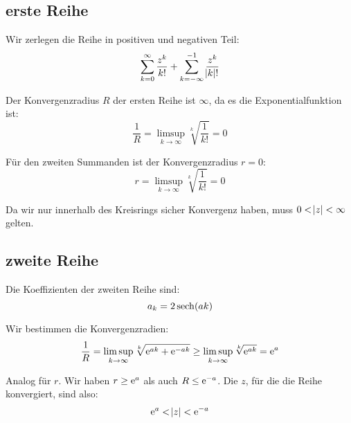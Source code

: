 \subsection{erste Reihe}

Wir zerlegen die Reihe in positiven und negativen Teil:
\[
	\sum_{k=0}^\infty \frac{z^k}{k!} + \sum_{k=-\infty}^{-1} \frac{z^k}{\abs k!}
\]

Der Konvergenzradius $R$ der ersten Reihe ist $\infty$, da es die Exponentialfunktion ist:
\[
	\frac 1R
	= \limsup_{k\to\infty} \sqrt[k]{\frac1{k!}}
	= 0
\]

Für den zweiten Summanden ist der Konvergenzradius $r = 0$:
\[
	r
	= \limsup_{k\to\infty} \sqrt[k]{\frac1{k!}}
	= 0
\]

Da wir nur innerhalb des Kreisrings sicher Konvergenz haben, muss $0 < \abs z <
\infty$ gelten.

\subsection{zweite Reihe}

Die Koeffizienten der zweiten Reihe sind:
\[
	a_k = 2 \operatorname{sech}(ak)
\]

Wir bestimmen die Konvergenzradien:
\[
	\frac 1R
	= \limsup_{k\to\infty} {\sqrt[k]{\mathrm e^{ak} + \mathrm e^{-ak}}}
	\geq \limsup_{k\to\infty} {\sqrt[k]{\mathrm e^{ak}}}
	= \mathrm e^{a}
\]

Analog für $r$. Wir haben $r \geq \mathrm e^a$ als auch $R \leq \mathrm e^{-a}$. Die $z$, für die die Reihe konvergiert, sind also:
\[
	\mathrm e^a < \abs z < \mathrm e^{-a}
\]

%
%



